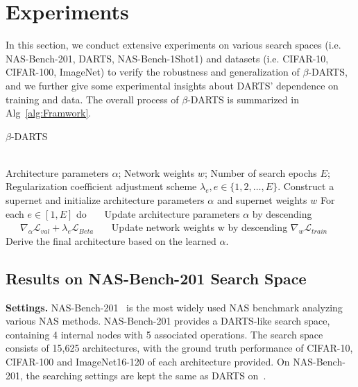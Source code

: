 \documentclass[10pt,twocolumn,letterpaper]{article}
\begin{document}
\section{Experiments} \label{sec:Exp}
In this section, we conduct extensive experiments on various search spaces (i.e. NAS-Bench-201, DARTS, NAS-Bench-1Shot1) and datasets (i.e. CIFAR-10, CIFAR-100, ImageNet) to verify the robustness and generalization of $\beta$-DARTS, and we further give some experimental insights about DARTS' dependence on training and data. The overall process of $\beta$-DARTS is summarized in Alg~\ref{alg:Framwork}. 
\begin{algorithm}[htb]
\caption{$\beta$-DARTS}   
\label{alg:Framwork}   
\begin{algorithmic}[1] \REQUIRE ~~\\ Architecture parameters $\alpha$; Network weights $w$; Number of search epochs $E$; Regularization coefficient adjustment scheme $\lambda_e, e\in \{1,2,…,E\}$.
\STATE Construct a supernet and initialize architecture parameters $\alpha$ and supernet weights $w$
\label{ code:fram:extract }\STATE For each $e\in \left[ 1, E \right]$ do   
\STATE ~~~Update architecture parameters $\alpha$ by descending \\ 
       ~~~$\nabla_\alpha \mathcal{L}_{val}+ \lambda_e\mathcal{L}_{Beta} $
\STATE ~~~Update network weights w by descending $\nabla_{w} \mathcal{L}_{train}$
\STATE Derive the final architecture based on the learned $\alpha$.
\end{algorithmic} 
\end{algorithm} 
\subsection{Results on NAS-Bench-201 Search Space} 
\noindent\textbf{Settings.} NAS-Bench-201~\cite{dong2020bench} is the most widely used NAS benchmark analyzing various NAS methods. NAS-Bench-201 provides a DARTS-like search space, containing 4 internal nodes with 5 associated operations. The search space consists of 15,625 architectures, with the ground truth performance of CIFAR-10, CIFAR-100 and ImageNet16-120 of each architecture provided. On NAS-Bench-201, the searching settings are kept the same as DARTS on~\cite{dong2020bench}.
\end{document}
